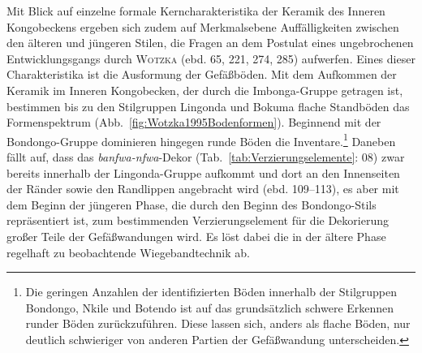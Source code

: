 Mit Blick auf einzelne formale Kerncharakteristika der Keramik des Inneren Kongobeckens ergeben sich zudem auf Merkmalsebene Auffälligkeiten zwischen den älteren und jüngeren Stilen, die Fragen an dem Postulat eines ungebrochenen Entwicklungsgangs durch \textsc{Wotzka} (ebd. 65, 221, 274, 285) aufwerfen. Eines dieser Charakteristika ist die Ausformung der Gefäßböden. Mit dem Aufkommen der Keramik im Inneren Kongobecken, der durch die Imbonga-Gruppe getragen ist, bestimmen bis zu den Stilgruppen Lingonda und Bokuma flache Standböden das Formenspektrum (Abb.~\ref{fig:Wotzka1995Bodenformen}). Beginnend mit der Bondongo-Gruppe dominieren hingegen runde Böden die Inventare.\footnote{Die geringen Anzahlen der identifizierten Böden innerhalb der Stilgruppen Bondongo, Nkile und Botendo ist auf das grundsätzlich schwere Erkennen runder Böden zurückzuführen. Diese lassen sich, anders als flache Böden, nur deutlich schwieriger von anderen Partien der Gefäßwandung unterscheiden.} Daneben fällt auf, dass das \textit{banfwa-nfwa}-Dekor (Tab.~\ref{tab:Verzierungselemente}: 08) zwar bereits innerhalb der Lingonda-Gruppe aufkommt und dort an den Innenseiten der Ränder sowie den Randlippen angebracht wird (ebd. 109--113), es aber mit dem Beginn der jüngeren Phase, die durch den Beginn des Bondongo-Stils repräsentiert ist, zum bestimmenden Verzierungselement für die Dekorierung großer Teile der Gefäßwandungen wird. Es löst dabei die in der ältere Phase regelhaft zu beobachtende Wiegebandtechnik ab.